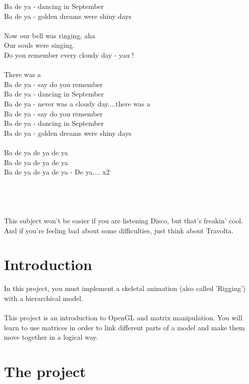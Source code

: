 \documentclass{42-en}
\begin{document}
{		Ba de ya - dancing in September\\
		Ba de ya - golden dreams were shiny days\\
		\\
		Now our bell was ringing, aha\\
		Our souls were singing.\\
		Do you remember every cloudy day - yau !\\
		\\
		There was a\\
		Ba de ya - say do you remember\\
		Ba de ya - dancing in September\\
		Ba de ya - never was a cloudy day....there was a\\
		Ba de ya - say do you remember\\
		Ba de ya - dancing in September\\
		Ba de ya - golden dreams were shiny days\\
		\\
		Ba de ya de ya de ya\\
		Ba de ya de ya de ya\\
		Ba de ya de ya de ya - De ya.... {x2}\\
		\\
		\\
		\\
		\\
		This subject won't be easier if you are listening Disco, but that's freakin' cool.\\
		And if you're feeling bad about some difficulties, just think about Travolta.\\
}

\newpage
	\chapter{Introduction}

		In this project, you must implement a skeletal animation (also called 'Rigging') with a hierarchical model.\\
		\\
		This project is an introduction to OpenGL and matrix manipulation. You will learn to use matrices in order to link different parts of a model and make them move together in a logical way.

\newpage
	\chapter{The project}
\end{document}
